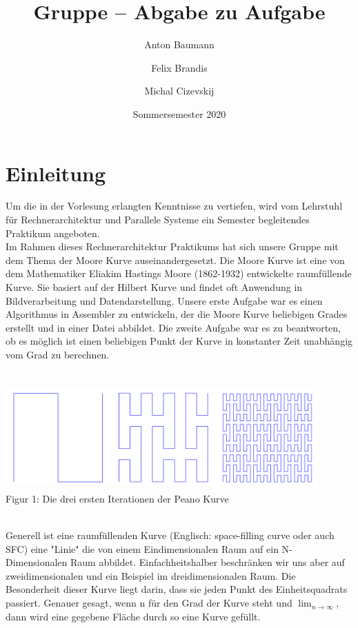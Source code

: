 \documentclass[course=erap]{aspdoc}
\author{Anton Baumann \and Felix Brandis \and Michal Cizevskij}
\date{Sommersemester 2020}  %
\title{Gruppe \theGroup{} -- Abgabe zu Aufgabe \theNumber}
\begin{document}
\maketitle

\section{Einleitung}

Um die in der Vorlesung erlangten Kenntnisse zu vertiefen, wird vom Lehrstuhl für Rechnerarchitektur und Parallele Systeme ein Semester begleitendes Praktikum angeboten.\\
Im Rahmen dieses Rechnerarchitektur Praktikums hat sich unsere Gruppe mit dem Thema der Moore Kurve auseinandergesetzt. Die Moore Kurve ist eine von dem Mathematiker Eliakim Hastings Moore (1862-1932) entwickelte raumfüllende Kurve. Sie basiert auf der Hilbert Kurve und findet oft Anwendung in Bildverarbeitung und Datendarstellung. Unsere erste Aufgabe war es einen Algorithmus in Assembler zu entwickeln, der die Moore Kurve beliebigen Grades erstellt und in einer Datei abbildet. Die zweite Aufgabe war es zu beantworten, ob es möglich ist einen beliebigen Punkt der Kurve in konstanter Zeit unabhängig vom Grad zu berechnen.\\
\\
\begin{center}
    \includegraphics[width=12cm, height=4cm]{Peano}\\ %
    \tiny Figur 1: Die drei ersten Iterationen der Peano Kurve
\end{center}
\   \\
Generell ist eine raumfüllenden Kurve (Englisch: space-filling curve oder auch SFC) eine "Linie" die von einem Eindimensionalen Raum auf ein N-Dimensionalen Raum abbildet. Einfachheitshalber beschränken wir uns aber auf zweidimensionalen und ein Beispiel im dreidimensionalen Raum. Die Besonderheit dieser Kurve liegt darin, dass sie jeden Punkt des Einheitsquadrats passiert. Genauer gesagt, wenn n für den Grad der Kurve steht und $\lim_{n\to\infty}$, dann wird eine gegebene Fläche durch so eine Kurve gefüllt.\\
\end{document}

